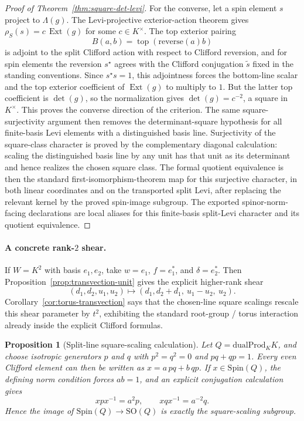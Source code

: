 \documentclass{birkjour}
\theoremstyle{plain}
\newtheorem{proposition}[theorem]{Proposition}
\theoremstyle{definition}
\theoremstyle{remark}
\newcommand{\Spin}{\mathrm{Spin}}
\newcommand{\SO}{\mathrm{SO}}
\newcommand{\dualProd}{\mathrm{dualProd}}
\newcommand{\ExtMap}{\operatorname{Ext}}
\begin{document}
\begin{proof}[Proof of Theorem~{}\ref{thm:square-det-levi}]
For the converse, let a spin element \(s\) project to \(\Lambda(g)\). The
Levi-projective exterior-action theorem gives
\(\rho_S(s)=c\,\ExtMap(g)\) for some \(c\in K^\times\). The top exterior
pairing
\[
  B(a,b)=\operatorname{top}(\mathrm{reverse}(a)b)
\]
is adjoint to the split Clifford action with respect to Clifford reversion, and
for spin elements the reversion \(s^\star\) agrees with the Clifford
conjugation \(\tilde s\) fixed in the standing conventions. Since \(s^\star s=1\),
this adjointness forces the bottom-line scalar and the top exterior coefficient
of \(\ExtMap(g)\) to multiply to \(1\). But the latter top coefficient is
\(\det(g)\), so the normalization gives \(\det(g)=c^{-2}\), a square in
\(K^\times\). This proves the converse direction of the criterion. The same square-surjectivity argument then
removes the determinant-square hypothesis for all finite-basis Levi elements
with a distinguished basis line. Surjectivity of the square-class character is
proved by the complementary diagonal calculation: scaling the distinguished
basis line by any unit has that unit as its determinant and hence realizes the
chosen square class. The formal quotient equivalence is then the standard
first-isomorphism-theorem map for this surjective character, in both linear coordinates and on
the transported split Levi, after replacing the relevant kernel by the proved spin-image subgroup.
The exported spinor-norm-facing declarations are local aliases for this
finite-basis split-Levi character and its quotient equivalence.
\end{proof}

\paragraph{A concrete rank-$2$ shear.}
If $W=K^2$ with basis $e_1,e_2$, take $w=e_1$, $f=e_1^*$, and
$\delta=e_2^*$. Then Proposition~{}\ref{prop:transvection-unit} gives the
explicit higher-rank shear
\[
  (d_1,d_2,u_1,u_2)\longmapsto (d_1,d_2+d_1,\ u_1-u_2,\ u_2).
\]
Corollary~{}\ref{cor:torus-transvection} says that the chosen-line square
scalings rescale this shear parameter by $t^2$, exhibiting the standard
root-group / torus interaction already inside the explicit Clifford formulas.

\begin{proposition}[Split-line square-scaling calculation]
\label{prop:split-line-square}
Let $Q=\dualProd_K K$, and choose isotropic generators $p$ and $q$ with
\(p^2=q^2=0\) and \(pq+qp=1\). Every even Clifford element can then be written
as \(x=a\,pq+b\,qp\). If \(x\in \Spin(Q)\), the defining norm condition forces
\(ab=1\), and an explicit conjugation calculation gives
\[
  x p x^{-1}=a^2 p,
  \qquad
  x q x^{-1}=a^{-2} q.
\]
Hence the image of $\Spin(Q)\to \SO(Q)$ is exactly the square-scaling subgroup.
\end{proposition}
\end{document}
